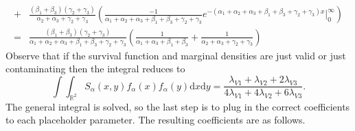 \begin{align*}
    +&\frac{\left(\beta_1+\beta_3\right)\left(\gamma_2+\gamma_3\right)}{\alpha_2+\alpha_3+\gamma_2+\gamma_3}\left(\frac{-1}{\alpha_1+\alpha_2+\alpha_3+\beta_1+\beta_3+\gamma_2+\gamma_3}e^{-\left(\alpha_1+\alpha_2+\alpha_3+\beta_1+\beta_3+\gamma_2+\gamma_3\right)x}\bigg|_0^{\infty}\right)\\
    =&\frac{\left(\beta_1+\beta_3\right)\left(\gamma_2+\gamma_3\right)}{\alpha_1+\alpha_2+\alpha_3+\beta_1+\beta_3+\gamma_2+\gamma_3}\left(\frac{1}{\alpha_1+\alpha_3+\beta_1+\beta_3}+\frac{1}{\alpha_2+\alpha_3+\gamma_2+\gamma_3}\right)
\end{align*}
Observe that if the survival function and marginal densities are just valid or just contaminating then the integral reduces to $$\int\int_{\mathbb{R}^2}S_{\alpha}\left(x,y\right)f_{\alpha}\left(x\right)f_{\alpha}\left(y\right)\mathrm{d}x\mathrm{d}y=\frac{\lambda_{V1}+\lambda_{V2}+2\lambda_{V3}}{4\lambda_{V1}+4\lambda_{V2}+6\lambda_{V3}}.$$ The general integral is solved, so the last step is to plug in the correct coefficients to each placeholder parameter. The resulting coefficients are as follows.
